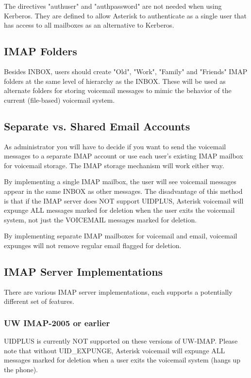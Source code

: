 The directives "authuser" and "authpassword" are not needed when using
Kerberos. They are defined to allow Asterisk to authenticate as a single 
user that has access to all mailboxes as an alternative to Kerberos.


\subsection{IMAP Folders}

Besides INBOX, users should create "Old", "Work", "Family" and "Friends" 
IMAP folders at the same level of hierarchy as the INBOX.  These will be 
used as alternate folders for storing voicemail messages to mimic the 
behavior of the current (file-based) voicemail system.


\subsection{Separate vs. Shared Email Accounts}

As administrator you will have to decide if you want to send the voicemail
messages to a separate IMAP account or use each user's existing IMAP mailbox
for voicemail storage.  The IMAP storage mechanism will work either way. 

By implementing a single IMAP mailbox, the user will see voicemail messages
appear in the same INBOX as other messages.  The disadvantage of this method
is that if the IMAP server does NOT support UIDPLUS, Asterisk voicemail will
expunge ALL messages marked for deletion when the user exits the voicemail 
system, not just the VOICEMAIL messages marked for deletion.

By implementing separate IMAP mailboxes for voicemail and email, voicemail 
expunges will not remove regular email flagged for deletion.


\subsection{IMAP Server Implementations}

There are various IMAP server implementations, each supports a potentially
different set of features.  


\subsubsection{UW IMAP-2005 or earlier}

UIDPLUS is currently NOT supported on these versions of UW-IMAP.  Please note
that without UID\_EXPUNGE, Asterisk voicemail will expunge ALL messages marked
for deletion when a user exits the voicemail system (hangs up the phone).

